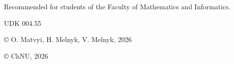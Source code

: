 \documentclass[a4paper,12pt]{report}
\begin{document}
\begin{large}
    Recommended for students of the Faculty of Mathematics and
Informatics.

\begin{flushright}
UDK 004.55
\end{flushright}

\begin{flushright}
© O. Matvyi, H. Melnyk, V. Melnyk, 2026

© ChNU, 2026
\end{flushright}


    \vfill


\pagebreak
\tableofcontents









%




























%

%

%

%




\end{large}
\end{document}
